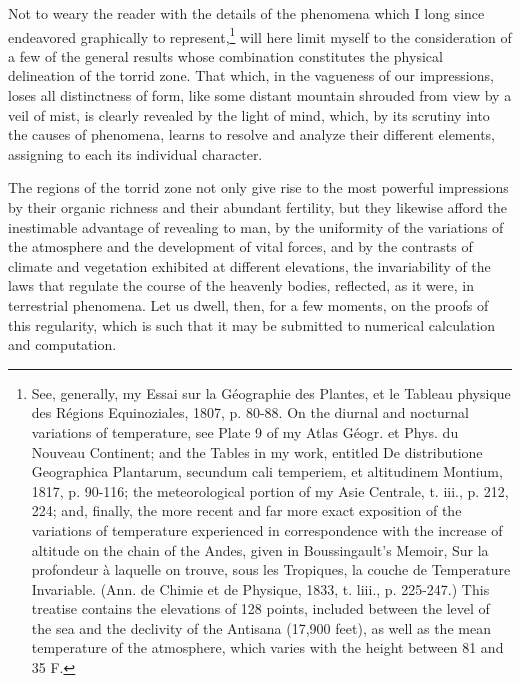 Not to weary the reader with the details of the phenomena which I long since endeavored graphically to represent,\footnote{See, generally, my Essai sur la G\'{e}ographie des Plantes, et le Tableau physique des R\'{e}gions Equinoziales, 1807, p. 80-88. On the diurnal and nocturnal variations of temperature, see Plate 9 of my Atlas G\'{e}ogr. et Phys. du Nouveau Continent; and the Tables in my work, entitled De distributione Geographica Plantarum, secundum cali temperiem, et altitudinem Montium, 1817, p. 90-116; the meteorological portion of my Asie Centrale, t. iii., p. 212, 224; and, finally, the more recent and far more exact exposition of the variations of temperature experienced in correspondence with the increase of altitude on the chain of the Andes, given in Boussingault's Memoir, Sur la profondeur à laquelle on trouve, sous les Tropiques, la couche de Temperature Invariable. (Ann. de Chimie et de Physique, 1833, t. liii., p. 225-247.) This treatise contains the elevations of 128 points, included between the level of the sea and the declivity of the Antisana (17,900 feet), as well as the mean temperature of the atmosphere, which varies with the height between 81 and 35 F.} will here limit myself to the consideration of a few of the general results whose combination constitutes the physical delineation of the torrid zone. That which, in the vagueness of our impressions, loses all distinctness of form, like some distant mountain shrouded from view by a veil of mist, is clearly revealed by the light of mind, which, by its scrutiny into the causes of phenomena, learns to resolve and analyze their different elements, assigning to each its individual character.

The regions of the torrid zone not only give rise to the most powerful impressions by their organic richness and their abundant fertility, but they likewise afford the inestimable advantage of revealing to man, by the uniformity of the variations of the atmosphere and the development of vital forces, and by the contrasts of climate and vegetation exhibited at different elevations, the invariability of the laws that regulate the course of the heavenly bodies, reflected, as it were, in terrestrial phenomena. Let us dwell, then, for a few moments, on the proofs of this regularity, which is such that it may be submitted to numerical calculation and computation.

